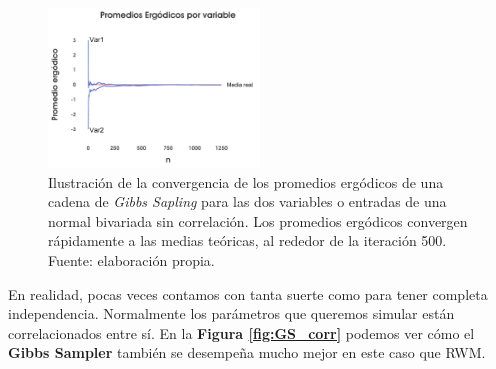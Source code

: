 \begin{figure}[h]
	\centering
	\includegraphics[width=0.5\textwidth]{Figs/Bayes/Ejemplo_GS_C}
    \caption{Ilustración de la convergencia de los promedios ergódicos de una cadena de \textit{Gibbs Sapling} para las dos variables o entradas de una normal bivariada sin correlación. Los promedios ergódicos convergen rápidamente a las medias teóricas, al rededor de la iteración 500. Fuente: elaboración propia.}\label{fig:GS_indep_ergo}
\end{figure}

En realidad, pocas veces contamos con tanta suerte como para tener completa independencia. Normalmente los parámetros que queremos simular están correlacionados entre sí. En la \textbf{Figura \ref{fig:GS_corr}} podemos ver cómo el \textbf{Gibbs Sampler} también se desempeña mucho mejor en este caso que RWM.\\
 
